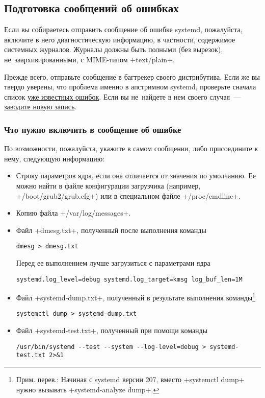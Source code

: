 \documentclass[10pt,oneside,a4paper]{article}
\begin{document}
\subsection{Подготовка сообщений об ошибках}

Если вы собираетесь отправить сообщение об ошибке systemd, пожалуйста,
включите в него диагностическую информацию, в частности, содержимое системных
журналов. Журналы должны быть полными (без вырезок), не~заархивированными, с
MIME-типом +text/plain+.

Прежде всего, отправьте сообщение в багтрекер своего дистрибутива. Если же вы
твердо уверены, что проблема именно в апстримном systemd, проверьте сначала
список
\href{https://bugs.freedesktop.org/buglist.cgi?query_format=advanced&bug_status=NEW&bug_status=ASSIGNED&bug_status=REOPENED&product=systemd}{уже
известных ошибок}. Если вы не~найдете в нем своего случая~---
\href{https://bugs.freedesktop.org/enter_bug.cgi?product=systemd}{заводите новую
запись}.

\subsubsection{Что нужно включить в сообщение об ошибке}

По возможности, пожалуйста, укажите в самом сообщении, либо присоедините к нему,
следующую информацию:
\begin{itemize}
	\item Строку параметров ядра, если она отличается от значения по
		умолчанию. Ее можно найти в файле конфигурации загрузчика
		(например, +/boot/grub2/grub.cfg+) или в специальном файле
		+/proc/cmdline+.
	\item Копию файла +/var/log/messages+.
	\item Файл +dmesg.txt+, полученный после выполнения команды
\begin{Verbatim}		
dmesg > dmesg.txt
\end{Verbatim}
		Перед ее выполнением лучше загрузиться с параметрами ядра
\begin{Verbatim}
systemd.log_level=debug systemd.log_target=kmsg log_buf_len=1M
\end{Verbatim}
	\item Файл +systemd-dump.txt+, полученный в результате выполнения
		команды\footnote{Прим. перев.: Начиная с systemd версии 207,
		вместо +systemctl dump+ нужно вызывать +systemd-analyze dump+.} 
\begin{Verbatim}
systemctl dump > systemd-dump.txt
\end{Verbatim}
	\item Файл +systemd-test.txt+, полученный при помощи команды
\begin{Verbatim}
/usr/bin/systemd --test --system --log-level=debug > systemd-test.txt 2>&1
\end{Verbatim}
\end{itemize}
\end{document}
